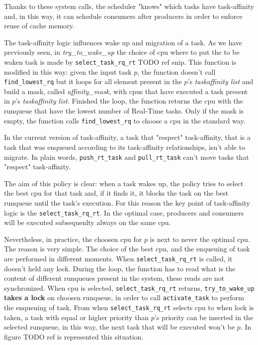 Thanks to these system calls, the scheduler "knows" which tasks have task-affinity and, in this way, it can schedule consumers after producers in order to 
enforce reuse of cache memory.

The task-affinity logic influences wake up and migration of a task. As we have previously seen, in \textit{try\_to\_wake\_up} the choice of cpu where to 
put the to be waken task is made by \texttt{select\_task\_rq\_rt} TODO ref snip. This function is modified in this way: given the input task $p$, the 
function doesn't call \texttt{find\_lowest\_rq} but it loops for all element present in the $p$'s \textit{taskaffinity list} and build a mask, called 
\textit{affinity\_mask}, with cpus that have executed a task present in $p$'s \textit{taskaffinity list}. Finished the loop, the function returns the cpu 
with the runqueue that have the lowest number of Real-Time tasks. Only if the mask is empty, the function calls \texttt{find\_lowest\_rq} to choose a cpu
in the standard way. 

In the current version of task-affinity, a task that "respect" task-affinity, that is a task that was enqueued according to its task-affinity 
relationships, isn't able to migrate. In plain words, \texttt{push\_rt\_task} and \texttt{pull\_rt\_task} can't move tasks that "respect" task-affinity.

The aim of this policy is clear: when a task wakes up, the policy tries to select the best cpu for that task and, if it finds it, it blocks the task on the 
best runqueue until the task's execution. For this reason the key point of task-affinity logic is the \texttt{select\_task\_rq\_rt}. In the optimal case, 
producers and consumers will be executed subsequenlty always on the same cpu.

Nevertheless, in practice, the choosen cpu for $p$ is next to never the optimal cpu. The reason is very simple. The choice of the best 
cpu, and the enqueuing of task are performed in different moments. When \texttt{select\_task\_rq\_rt} is called, it doesn't held any lock. During the loop, 
the function has to read what is the content of different runqueues present in the system, these reads are not synchronized. When cpu is selected, 
\texttt{select\_task\_rq\_rt} returns, \texttt{try\_to\_wake\_up} \textbf{takes a lock} on choosen runqueue, in order to call \texttt{activate\_task} 
to perform the enqueuing of task. From when \texttt{select\_task\_rq\_rt} selects cpu to when lock is taken, a task with equal or higher priority than 
$p$'s priority can be inserted in the selected runqueue, in this way, the next task that will be executed won't be $p$. In figure TODO ref is represented 
this situation.

